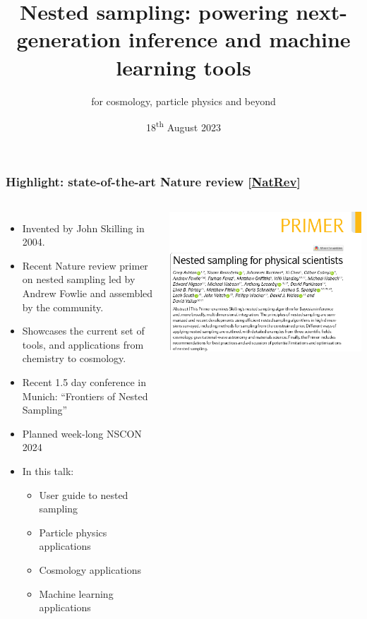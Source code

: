 \documentclass[aspectratio=169]{beamer}
\title{ Nested sampling: {\large powering next-generation inference and machine learning tools}}
\subtitle{for cosmology, particle physics and beyond}
\date{18\textsuperscript{th} August 2023}
\begin{document}
\begin{frame}
    \titlepage
\end{frame}

\begin{frame}
    \frametitle{Highlight: state-of-the-art Nature review [\href{https://www.nature.com/articles/s43586-022-00121-x}{NatRev}]}
    \begin{columns}
        \begin{itemize}
            \item Invented by John Skilling in 2004.
            \item Recent Nature review primer on nested sampling led by Andrew Fowlie and assembled by the community.
            \item Showcases the current set of tools, and applications from chemistry to cosmology.
            \item Recent 1.5 day conference in Munich: ``Frontiers of Nested Sampling''
            \item Planned week-long NSCON 2024
            \item In this talk:
                \begin{itemize}
                    \item User guide to nested sampling
                    \item Particle physics applications
                    \item Cosmology applications
                    \item Machine learning applications
                \end{itemize}
        \end{itemize}
        \includegraphics[width=\textwidth]{figures/nature1}

\end{columns}
\end{frame}
\end{document}
